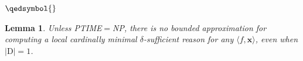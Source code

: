 \documentclass{article}
\newtheorem{lemma}{Lemma}
\newcommand{\z}{\textbf{z}}
\newcommand{\x}{\textbf{x}}
\begin{document}








$\qedsymbol{}$






\begin{lemma}
    Unless PTIME$=$NP, there is \emph{no bounded approximation} for computing a local cardinally minimal $\delta$-sufficient reason for any $\langle f,\x\rangle$, even when $|\text{D}| = 1$.
\end{lemma}
\end{document}
